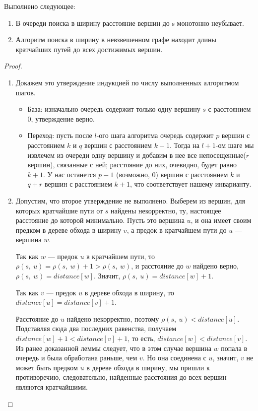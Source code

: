 \documentclass[a4paper,12pt]{article}
\begin{document}
\begin{theorem}
    Выполнено следующее:
    \begin{enumerate}
        \item В очереди поиска в ширину расстояние вершин до s монотонно неубывает.
        \item Алгоритм поиска в ширину в невзвешенном графе находит длины кратчайших путей до всех достижимых вершин.
    \end{enumerate}
\end{theorem}
\begin{proof}
\begin{enumerate}
    \item Докажем это утверждение индукцией по числу выполненных алгоритмом шагов.
    \begin{itemize}
        \item База: изначально очередь содержит только одну вершину $s$ с расстоянием 0, утверждение верно.
        \item Переход: пусть после $l$-ого шага алгоритма очередь содержит $p$ вершин с расстоянием $k$ и $q$ вершин с расстоянием $k + 1$. Тогда на $l+1$-ом шаге мы извлечем из очереди одну вершину и добавим в нее все непосещенные($r$ вершин), связанные с ней; расстояние до них, очевидно, будет равно $k + 1$. У нас останется $p - 1$ (возможно, 0) вершин с расстоянием $k$ и $q + r$ вершин с расстоянием $k + 1$, что соответствует нашему инварианту.
    \end{itemize}
    \item Допустим, что второе утверждение не выполнено. Выберем из вершин, для которых кратчайшие пути от $s$ найдены некорректно, ту, настоящее расстояние до которой минимально. Пусть это вершина $u$, и она имеет своим предком в дереве обхода в ширину $v$, а предок в кратчайшем пути до $u$ — вершина $w$.

    Так как $w$ — предок $u$ в кратчайшем пути, то $\rho(s,\ u) = \rho(s,\ w) + 1 > \rho(s,\ w)$, и расстояние до $w$ найдено верно, $\rho(s,\ w) = distance[w]$. Значит, $\rho(s,\ u) = distance[w] + 1$.

    Так как $v$ — предок $u$ в дереве обхода в ширину, то $distance[u] = distance[v] + 1$.

    Расстояние до $u$ найдено некорректно, поэтому $\rho(s,\ u) < distance[u]$. Подставляя сюда два последних равенства, получаем $distance[w] + 1 < distance[v] + 1$, то есть, $distance[w] < distance[v]$. Из ранее доказанной леммы следует, что в этом случае вершина $w$ попала в очередь и была обработана раньше, чем $v$. Но она соединена с $u$, значит, $v$ не может быть предком $u$ в дереве обхода в ширину, мы пришли к противоречию, следовательно, найденные расстояния до всех вершин являются кратчайшими.
\end{enumerate}
\end{proof}
\end{document}
